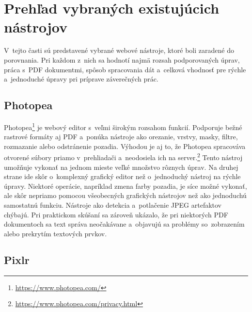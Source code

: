 \section{Prehľad vybraných existujúcich nástrojov}
V~tejto časti sú predstavené vybrané webové nástroje, ktoré boli zaradené do porovnania. Pri každom z~nich sa hodnotí najmä rozsah podporovaných úprav, práca s~PDF dokumentmi, spôsob spracovania dát a~celková vhodnosť pre rýchle a~jednoduché úpravy pri príprave záverečných prác.

\subsection{Photopea}

Photopea\footnote{\url{https://www.photopea.com/}} je webový editor s~veľmi širokým rozsahom funkcií. Podporuje bežné rastrové formáty aj PDF a~ponúka nástroje ako orezanie, vrstvy, masky, filtre, rozmazanie alebo odstránenie pozadia. Výhodou je aj to, že Photopea spracováva otvorené súbory priamo v~prehliadači a~neodosiela ich na server.\footnote{\url{https://www.photopea.com/privacy.html}} Tento nástroj umožňuje vykonať na jednom mieste veľké množstvo rôznych úprav. Na druhej strane ide skôr o~komplexný grafický editor než o~jednoduchý nástroj na rýchle úpravy. Niektoré operácie, napríklad zmena farby pozadia, je síce možné vykonať, ale skôr nepriamo pomocou všeobecných grafických nástrojov než ako jednoduchú samostatnú funkciu. Nástroje ako detekcia a~potlačenie JPEG artefaktov chýbajú. Pri praktickom skúšaní sa zároveň ukázalo, že pri niektorých PDF dokumentoch sa text správa neočakávane a~objavujú sa problémy so~zobrazením alebo prekrytím textových prvkov.

\subsection{Pixlr}

